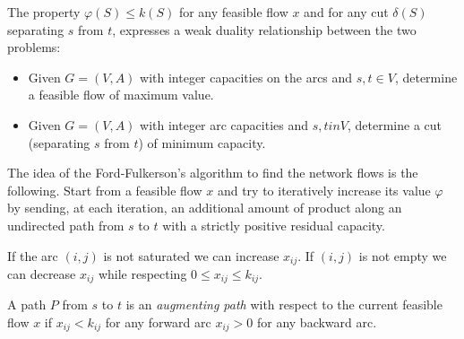 \documentclass[12pt, a4paper]{report}
\newtheorem[style=M,bodystyle=\normalfont]{proposition}{Proposition}
\newtheorem[style=M,bodystyle=\normalfont]{theorem}{Theorem}
\newtheorem[style=M,bodystyle=\normalfont]{corollary}{Corollary}
\newtheorem[style=M,bodystyle=\normalfont]{lemma}{Lemma}
\newtheorem[style=M,bodystyle=\normalfont]{definition}{Definition}
\begin{document}
    The property $\varphi(S) \leq k(S)$ for any feasible flow $x$ and for any cut $\delta(S)$ separating $s$ from $t$, expresses a weak duality relationship between the two problems:
    \begin{itemize}
        \item Given $G = (V,A)$ with integer capacities on the arcs and $s,t \in V$, determine a feasible flow of maximum value. 
        \item Given $G = (V,A)$ with integer arc capacities and $s,t in V$, determine a cut (separating $s$ from $t$) of minimum capacity. 
    \end{itemize} 

    The idea of the Ford-Fulkerson's algorithm to find the network flows is the following. Start from a feasible flow $x$ and try to iteratively increase its value $\varphi$ by 
    sending, at each iteration, an additional amount of product along an undirected path from $s$ to $t$ with a strictly positive residual capacity. 

    If the arc $(i,j)$ is not saturated we can increase $x_{ij}$. If $(i,j)$ is not empty we can decrease $x_{ij}$ while respecting $0 \leq x_{ij} \leq k_{ij}$. 
    \begin{definition}
        A path $P$ from $s$ to $t$ is an \emph{augmenting path} with respect to the current feasible flow $x$ if $x_{ij} <  k_{ij}$ for any
        forward arc $x_{ij}>0$ for any backward arc. 
    \end{definition}
\end{document}
